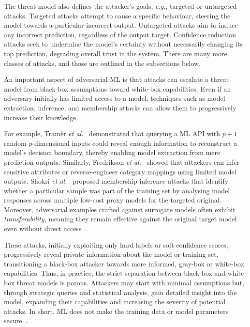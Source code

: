 The threat model also defines the attacker’s goals, \textit{e.g.}, targeted or untargeted attacks. 
Targeted attacks attempt to cause a specific behaviour, steering the model towards a particular incorrect output. 
Untargeted attacks aim to induce any incorrect prediction, regardless of the output target. 
Confidence reduction attacks seek to undermine the model’s certainty without necessarily changing its top prediction, degrading overall trust in the system.
There are many more classes of attacks, and those are outlined in the subsections below.

An important aspect of adversarial ML is that attacks can escalate a threat model from black-box assumptions toward white-box capabilities. 
Even if an adversary initially has limited access to a model, techniques such as model extraction, inference, and membership attacks can allow them to progressively increase their knowledge.

For example, Tram\`er \textit{et al.}~\cite{tramer2016stealing} demonstrated that querying a ML API with $p+1$ random $p$-dimensional inputs could reveal enough information to reconstruct a model’s decision boundary, thereby enabling model extraction from mere prediction outputs. 
Similarly, Fredrikson \textit{et al.}~\cite{fredrikson2015model} showed that attackers can infer sensitive attributes or reverse-engineer category mappings using limited model outputs. 
Shokri \textit{et al.}~\cite{shokri2017membership} proposed membership inference attacks that identify whether a particular sample was part of the training set by analysing model responses across multiple low-cost proxy models for the targeted original. 
Moreover, adversarial examples crafted against surrogate models often exhibit \textit{transferability}, meaning they remain effective against the original target model even without direct access~\cite{zhong2020towards,tramer2016stealing}. 

These attacks, initially exploiting only hard labels or soft confidence scores, progressively reveal private information about the model or training set, transitioning a black-box attacker towards more informed, gray-box or white-box capabilities.
Thus, in practice, the strict separation between black-box and white-box threat models is porous. 
Attackers may start with minimal assumptions but, through strategic queries and statistical analysis, gain detailed insight into the model, expanding their capabilities and increasing the severity of potential attacks.
In short, ML does not make the training data or model parameters secure~\cite{abelson2021bugs}.

